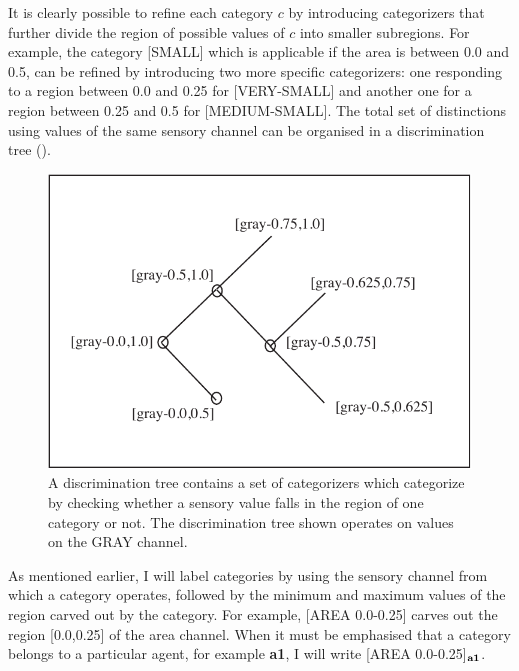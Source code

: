 It is clearly possible to refine each 
category $c$ by introducing categorizers that 
further divide the region of possible values of $c$ into 
smaller subregions. For example, the category [SMALL] which 
is applicable if the area is between 0.0 and 0.5, can be refined 
by introducing two more specific categorizers: one responding
to a region between 0.0 and 
0.25 for [VERY-SMALL] and another one for a region
between 0.25 and 0.5 for [MEDIUM-SMALL]. The total set of
distinctions using values of the same sensory channel
can be organised in a discrimination tree (). 
\begin{figure}[htbp]
  \centerline{\includegraphics[width=.65\textwidth]{chap4/figs/tree}}
\caption{\label{trees} A discrimination tree contains
a set of categorizers which categorize by checking whether
a sensory value falls in the region of one category or 
not. The discrimination tree shown operates on
values on the GRAY channel.}
\end{figure}

As mentioned earlier, I will label categories
by using the sensory channel from which a category operates, 
followed by the minimum and maximum values of the region
carved out by the category. For example, 
[AREA 0.0-0.25] carves out the region [0.0,0.25] of the 
area channel. When it must be emphasised that 
a category belongs to a particular agent, for 
example {\bf a1}, I will write [AREA 0.0-0.25]$_{\bf a1}$. 

